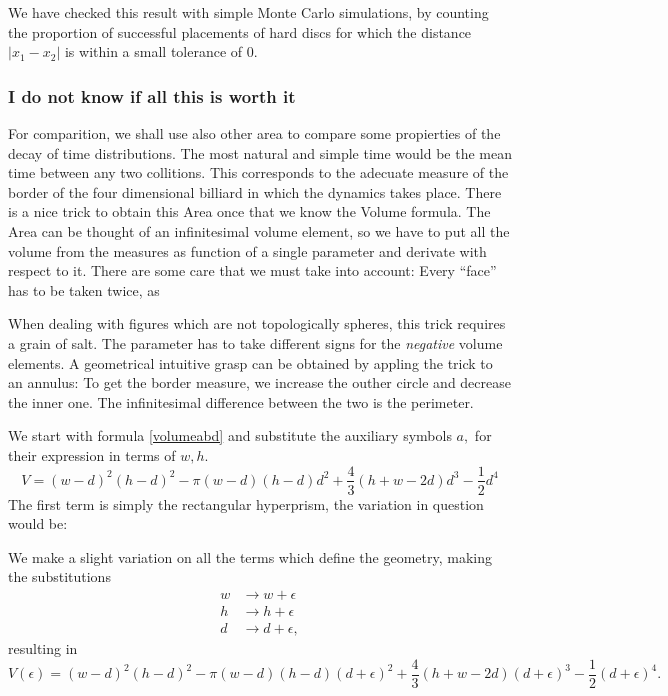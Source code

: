 \documentclass[letterpaper,12pt]{amsart}
\begin{document}
We have checked this result with simple Monte Carlo simulations, by counting the proportion of successful placements of hard discs for which the distance $|x_1 - x_2|$ is within a small tolerance of $0$.


\subsubsection{I do not know if all this is worth it\ldot}
For comparition, we shall use also other area to compare
some propierties of the decay of time distributions. The most natural and simple
time would be the mean time between any two collitions. This corresponds
to the adecuate measure of the border of the four dimensional
billiard in which the dynamics takes place. There is a nice trick
to obtain this Area once that we know the Volume formula. The Area
can be thought of an infinitesimal volume element, so we have to put
all the volume from the measures as function of a single parameter
and derivate with respect to it. 
There are some care that we must take into account:
Every ``face'' has to be taken twice, as  

When dealing with figures
which are not topologically spheres, this trick requires
a grain of salt. The parameter has to take different
signs for the \emph{negative} volume elements. A geometrical
intuitive grasp can be obtained by appling the trick to an annulus:
To get the border measure, we increase the outher circle and
decrease the inner one. The infinitesimal difference between the two
is the perimeter. 


 We start with formula \ref{volumeabd}
and substitute the auxiliary symbols $a,$ for their expression in
terms of $w,h$.
\begin{equation}\label{volumehwd}
 V= (w-d)^2(h-d)^2-\pi(w-d)(h-d)d^2+\frac{4}{3}(h+w-2d)d^3-\frac{1}{2}d^4
\end{equation}
The first term is simply the rectangular hyperprism, the variation in question
would be:

We make a slight variation on all the terms which  define the geometry,
making the substitutions
\begin{align}
w & \rightarrow w+\epsilon \\
h & \rightarrow h+\epsilon \\
d & \rightarrow d+\epsilon ,
\end{align}
resulting in
\begin{equation}\label{volumeepsilon}
 V(\epsilon) = (w-d)^2(h-d)^2-\pi(w-d)(h-d)(d+\epsilon)^2+
\frac{4}{3}(h+w-2d)(d+\epsilon)^3-\frac{1}{2}(d+\epsilon)^4.
\end{equation}
\end{document}
